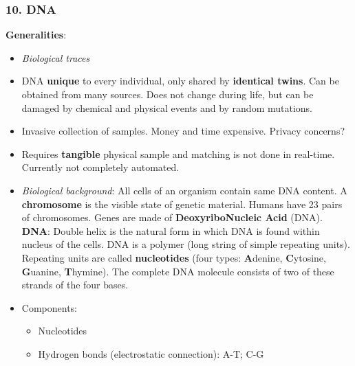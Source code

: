 \documentclass[a4paper]{article}
\begin{document}
    \subsubsection*{10. DNA}
      \textbf{Generalities}:
      \begin{itemize}
        \item \emph{Biological traces}
        \item DNA \textbf{unique} to every individual, only shared by \textbf{identical twins}. Can be obtained from many sources. Does not change during life, but can be damaged by chemical and physical events and by random mutations.
        \item Invasive collection of samples. Money and time expensive. Privacy concerns?
        \item Requires \textbf{tangible} physical sample and matching is not done in real-time. Currently not completely automated.
        \item \emph{Biological background}: All cells of an organism contain same DNA content. A \textbf{chromosome} is the visible state of genetic material. Humans have 23 pairs of chromosomes. Genes are made of \textbf{DeoxyriboNucleic Acid} (DNA).\\
        \textbf{DNA}: Double helix is the natural form in which DNA is found within nucleus of the cells. DNA is a polymer (long string of simple repeating units). Repeating units are called \textbf{nucleotides} (four types: \textbf{A}denine, \textbf{C}ytosine, \textbf{G}uanine, \textbf{T}hymine). The complete DNA molecule consists of two of these strands of the four bases.
        \item Components:
        \begin{itemize}
          \item Nucleotides
          \item Hydrogen bonds (electrostatic connection): A-T; C-G
        \end{itemize}
      \end{itemize}
\end{document}
